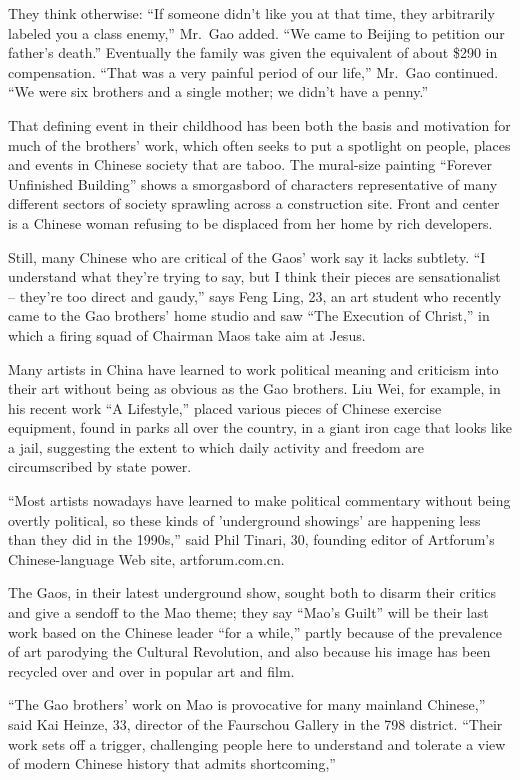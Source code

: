 ﻿\documentclass[12pt]{article}
\begin{document}
They think otherwise: ``If someone didn't like you at that time, they arbitrarily labeled you a
class enemy,'' Mr.~Gao added. ``We came to Beijing to petition our father's death.'' Eventually the
family was given the equivalent of about \$290 in compensation. ``That was a very painful period of
our life,'' Mr.~Gao continued. ``We were six brothers and a single mother; we didn't have a penny.''

That defining event in their childhood has been both the basis and motivation for much of the
brothers' work, which often seeks to put a spotlight on people, places and events in Chinese society
that are taboo. The mural-size painting ``Forever Unfinished Building'' shows a smorgasbord of
characters representative of many different sectors of society sprawling across a construction site.
Front and center is a Chinese woman refusing to be displaced from her home by rich developers.

Still, many Chinese who are critical of the Gaos' work say it lacks subtlety. ``I understand what
they're trying to say, but I think their pieces are sensationalist -- they're too direct and
gaudy,'' says Feng Ling, 23, an art student who recently came to the Gao brothers' home studio and
saw ``The Execution of Christ,'' in which a firing squad of Chairman Maos take aim at Jesus.

Many artists in China have learned to work political meaning and criticism into their art without
being as obvious as the Gao brothers. Liu Wei, for example, in his recent work ``A Lifestyle,''
placed various pieces of Chinese exercise equipment, found in parks all over the country, in a giant
iron cage that looks like a jail, suggesting the extent to which daily activity and freedom are
circumscribed by state power.

``Most artists nowadays have learned to make political commentary without being overtly political,
so these kinds of 'underground showings' are happening less than they did in the 1990s,'' said Phil
Tinari, 30, founding editor of Artforum's Chinese-language Web site, artforum.com.cn.

The Gaos, in their latest underground show, sought both to disarm their critics and give a sendoff
to the Mao theme; they say ``Mao's Guilt'' will be their last work based on the Chinese leader ``for
a while,'' partly because of the prevalence of art parodying the Cultural Revolution, and also
because his image has been recycled over and over in popular art and film.

``The Gao brothers' work on Mao is provocative\cite{provocative} for many mainland Chinese,'' said
Kai Heinze, 33, director of the Faurschou Gallery in the 798 district. ``Their work sets off a
trigger, challenging people here to understand and tolerate a view of modern Chinese history that
admits shortcoming,''
\end{document}
